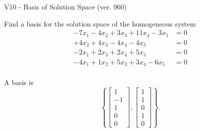 \begin{exercise}
  \begin{exerciseTitle}V10 - Basis of Solution Space (ver. 960)\end{exerciseTitle}
  \begin{exerciseStatement}
    Find a basis for the solution space of the homogeneous system 
\begin{align*}
 -7 x_ 1 -4 x_ 2 + 3 x_ 3 + 11 x_ 4 -3 x_ 5 &= 0  \\ 
  + 4 x_ 2 + 4 x_ 3 -4 x_ 4 -4 x_ 5 &= 0  \\ 
  -2 x_ 1 + 2 x_ 3 + 2 x_ 4 + 5 x_ 5 &= 0  \\ 
  -4 x_ 1 + 1 x_ 2 + 5 x_ 3 + 3 x_ 4 -6 x_ 5 &= 0  \\ 
 \end{align*}


 
  \end{exerciseStatement}

  \begin{exerciseAnswer}
   A basis is   
\[\left\{\left[\begin{array}{c}
1 \\
-1 \\
1 \\
0 \\
0
\end{array}\right] , \left[\begin{array}{c}
1 \\
1 \\
0 \\
1 \\
0
\end{array}\right]\right\}.\]

  


  \end{exerciseAnswer}
\end{exercise}
